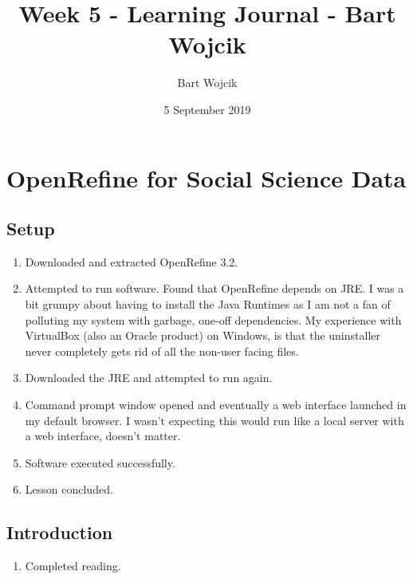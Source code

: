 \documentclass{article}
\title{Week 5 - Learning Journal   - Bart Wojcik}
\author{Bart Wojcik}
\date{5 September 2019}
\begin{document}
\maketitle

\section{OpenRefine for Social Science Data}
\subsection{Setup}
\begin{enumerate}
    \item Downloaded and extracted OpenRefine 3.2.
    \item Attempted to run software. Found that OpenRefine depends on JRE. I was a bit grumpy about having to install the Java Runtimes as I am not a fan of polluting my system with garbage, one-off dependencies. My experience with VirtualBox (also an Oracle product) on Windows, is that the uninstaller never completely gets rid of all the non-user facing files.
    \item Downloaded the JRE and attempted to run again.
    \item Command prompt window opened and eventually a web interface launched in my default browser. I wasn't expecting this would run like a local server with a web interface, doesn't matter.
    \item Software executed successfully.
    \item Lesson concluded.
\end{enumerate}
\subsection{Introduction}
\begin{enumerate}
    \item Completed reading.
\end{enumerate}
\end{document}
